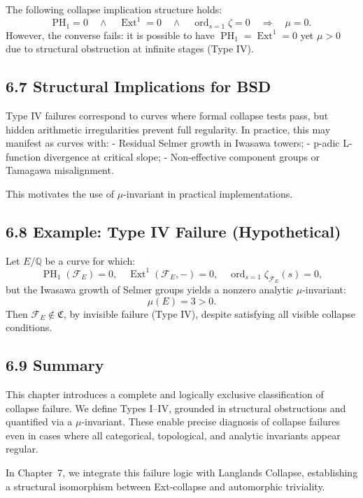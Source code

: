 \documentclass[11pt]{article}
\DeclareMathOperator{\Ext}{Ext}
\DeclareMathOperator{\PH}{PH}
\newcommand{\ord}{\operatorname{ord}}
\begin{document}
The following collapse implication structure holds:
\[
\text{PH}_1 = 0 \quad \land \quad \Ext^1 = 0 \quad \land \quad \ord_{s=1} \zeta = 0
\quad \Longrightarrow \quad \mu = 0.
\]
However, the converse fails: it is possible to have \( \PH_1 = \Ext^1 = 0 \) yet \( \mu > 0 \) due to structural obstruction at infinite stages (Type IV).

\subsection*{6.7 Structural Implications for BSD}

Type IV failures correspond to curves where formal collapse tests pass, but hidden arithmetic irregularities prevent full regularity. In practice, this may manifest as curves with:
- Residual Selmer growth in Iwasawa towers;
- p-adic L-function divergence at critical slope;
- Non-effective component groups or Tamagawa misalignment.

This motivates the use of \(\mu\)-invariant in practical implementations.

\subsection*{6.8 Example: Type IV Failure (Hypothetical)}

Let \( E/\mathbb{Q} \) be a curve for which:
\[
\PH_1(\mathcal{F}_E) = 0, \quad \Ext^1(\mathcal{F}_E, -) = 0, \quad \ord_{s=1} \zeta_{\mathcal{F}_E}(s) = 0,
\]
but the Iwasawa growth of Selmer groups yields a nonzero analytic \(\mu\)-invariant:
\[
\mu(E) = 3 > 0.
\]
Then \( \mathcal{F}_E \notin \mathfrak{C} \), by invisible failure (Type IV), despite satisfying all visible collapse conditions.

\subsection*{6.9 Summary}

This chapter introduces a complete and logically exclusive classification of collapse failure. We define Types I–IV, grounded in structural obstructions and quantified via a \(\mu\)-invariant. These enable precise diagnosis of collapse failures even in cases where all categorical, topological, and analytic invariants appear regular.

In Chapter~7, we integrate this failure logic with Langlands Collapse, establishing a structural isomorphism between Ext-collapse and automorphic triviality.
\end{document}
